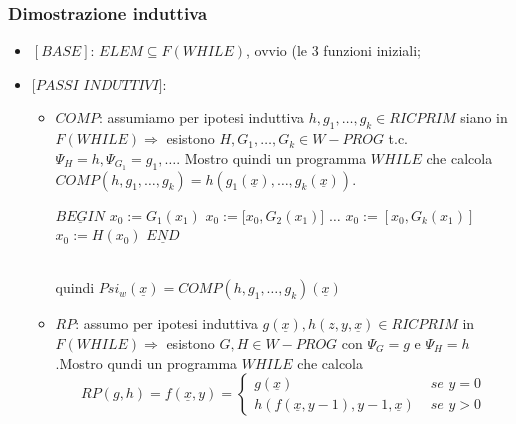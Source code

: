 \documentclass{article}
\begin{document}
\subsubsection{Dimostrazione induttiva}
\begin{itemize}
	\item $[BASE]$: $ELEM \subseteq F(WHILE)$, ovvio (le 3 funzioni iniziali;
	\item $[PASSI$ $INDUTTIVI]$:
		\begin{itemize}
			\item $COMP$: assumiamo per ipotesi induttiva $h,g_1,\dots,g_k \in RICPRIM$ siano in $F(WHILE) \Rightarrow$ esistono $H,G_1,\dots,G_k \in W-PROG$ t.c. $\Psi_H=h,\Psi_{G_1}=g_1,\dots$. Mostro quindi un programma $WHILE$ che calcola $COMP(h,g_1,\dots,g_k)=h(g_1(\underline{x}),\dots,g_k(\underline{x}))$.
			\begin{algorithm}
			\caption{$w \equiv$}
        \begin{algorithmic}[1]
        		 \State $\underline{BEGIN}$ 
        		 \State $x_0 := G_1(x_1)$
        		 \State $x_0 := [x_0, G_2(x_1)$] 
        		 \State $\dots$
        		 \State $x_0 := [x_0,G_k(x_1)]$ 
        		 \State $x_0 := H(x_0)$ 
        		 \State $\underline{END}$
        		 
        \end{algorithmic}
    \end{algorithm}
    \\
    		quindi $Psi_w(\underline{x})=COMP(h,g_1,\dots,g_k)(\underline{x})$
    			
    			\item $RP$: assumo per ipotesi induttiva $g(\underline{x}), h(z,y,\underline{x}) \in RICPRIM$ in $F(WHILE) \Rightarrow$ esistono $G,H \in W-PROG$ con $\Psi_G=g$ e $\Psi_H=h$.Mostro qundi un programma $WHILE$ che calcola
    			\begin{displaymath}
    				RP(g,h)=f(\underline{x},y)=
    				\begin{cases}
    					g(\underline{x}) &\textit{ se } y=0\\
    					h(f(\underline{x},y-1),y-1,\underline{x}) &\textit{ se } y>0
    				\end{cases}
    			\end{displaymath}
    			

\end{itemize}
\end{itemize}
\end{document}
